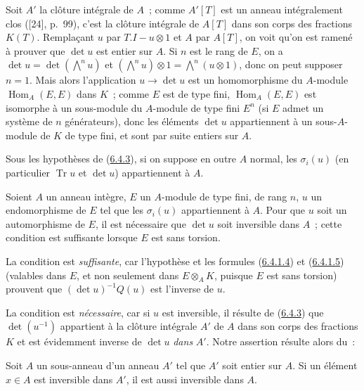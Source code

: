 Soit $A'$ la clôture intégrale de $A$~; comme $A'[T]$ est un anneau
intégralement clos ([24], p.~99), c'est la clôture intégrale de
$A[T]$ dans son corps des fractions $K(T)$. Remplaçant $u$ par
$T.I-u\otimes1$ et $A$ par $A[T]$, on voit qu'on est ramené à prouver que
$\det u$ est entier sur $A$. Si $n$ est le rang de $E$, on a
$\det u=\det(\bigwedge^n u)$ et
$(\bigwedge^n u)\otimes1=\bigwedge^n(u\otimes1)$, donc on peut supposer
$n=1$. Mais alors l'application $u\to\det u$ est un homomorphisme du
$A$-module $\operatorname{Hom}_A(E,E)$ dans $K$~; comme $E$ est de type fini,
$\operatorname{Hom}_A(E,E)$ est isomorphe à un sous-module du $A$-module de
type fini $E^n$ (si $E$ admet un système de $n$ générateurs), donc les
éléments $\det u$ appartiennent à un sous-$A$-module de $K$ de type fini, et
sont par suite entiers sur $A$.


\begin{corollary}[6.4.4]
\label{II.6.4.4-fr}
Sous les hypothèses de \textup{(\hyperref[II.6.4.3-fr]{6.4.3})}, si on suppose en outre
$A$ normal, les $\sigma_i(u)$ (en particulier $\operatorname{Tr}u$ et
$\det u$) appartiennent à $A$.
\end{corollary}

\begin{proposition}[6.4.5]
\label{II.6.4.5-fr}
Soient $A$ un anneau intègre, $E$ un $A$-module de type fini, de rang $n$, $u$
un endomorphisme de $E$ tel que les $\sigma_i(u)$ appartiennent à $A$. Pour
que $u$ soit un automorphisme de $E$, il est nécessaire que $\det u$ soit
inversible dans $A$~; cette condition est suffisante lorsque $E$ est sans
torsion.
\end{proposition}

La condition est \emph{suffisante}, car l'hypothèse et les formules
(\hyperref[II.6.4.1.4-fr]{6.4.1.4}) et
(\hyperref[II.6.4.1.5-fr]{6.4.1.5}) (valables dans $E$, et non seulement dans
$E\otimes_AK$, puisque $E$ est sans torsion) prouvent que
$(\det u)^{-1}Q(u)$ est l'inverse de $u$.

La condition est \emph{nécessaire}, car si $u$ est inversible, il résulte de
(\hyperref[II.6.4.3-fr]{6.4.3}) que $\det(u^{-1})$ appartient à la clôture
intégrale $A'$ de $A$ dans son corps des fractions $K$ et est évidemment
inverse de $\det u$ \emph{dans} $A'$. Notre assertion résulte alors du~:

\begin{lemma}[6.4.5.1]
\label{II.6.4.5.1-fr}
Soit $A$ un sous-anneau d'un anneau $A'$ tel que $A'$ soit \textup{entier} sur $A$. Si
un élément $x\in A$ est inversible dans $A'$, il est aussi inversible dans
$A$.
\end{lemma}

